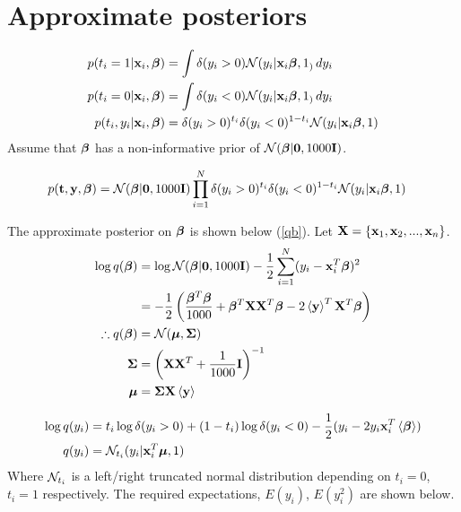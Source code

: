 \documentclass{article}
\begin{document}
\section{Approximate posteriors}
\begin{align}
\nonumber p(t_i=1|\mathbf{x}_i,\bm{\beta})&=\int \delta(y_i>0){\mathcal{N}}(y_i|\mathbf{x}_i\bm{\beta},1_)\,dy_i\\
\nonumber p(t_i=0|\mathbf{x}_i,\bm{\beta})&=\int \delta(y_i<0){\mathcal{N}}(y_i|\mathbf{x}_i\bm{\beta},1_)\,dy_i\\
p(t_i,y_i|\mathbf{x}_i,\bm{\beta})&=\delta(y_i>0)^{t_i}\delta(y_i<0)^{1-t_i}{\mathcal{N}}(y_i|\mathbf{x}_i\bm{\beta},1)
\end{align}
Assume that $\bm{\beta}$ has a non-informative prior of ${\mathcal{N}}(\bm{\beta}|{\mathbf{0}},1000\mathbf{I})$.

\begin{align}
p({\mathbf{t}},\mathbf{y},\bm{\beta})&={\mathcal{N}}(\bm{\beta}|{\mathbf{0}},1000\mathbf{I})\prod_{i=1}^{N}\delta(y_i>0)^{t_i}\delta(y_i<0)^{1-t_i}{\mathcal{N}}(y_i|\mathbf{x}_i\bm{\beta},1)
\end{align}

The approximate posterior on $\bm{\beta}$ is shown below (\eqref{qb}). Let $\mathbf{X}=\{\mathbf{x}_1,\mathbf{x}_2,...,\mathbf{x}_n\}$.
\begin{align}
\nonumber\log q(\bm{\beta})&=\log {\mathcal{N}}(\bm{\beta}|{\mathbf{0}},1000\mathbf{I})-\frac{1}{2}\sum_{i=1}^{N}(y_i-\mathbf{x}_i^T\bm{\beta})^2\\
\nonumber&=-\frac{1}{2}\left(\frac{\bm{\beta}^T\bm{\beta}}{1000}+\bm{\beta}^T\mathbf{X}\mathbf{X}^T\bm{\beta}-2\left\langle\mathbf{y}\right\rangle^T\mathbf{X}^T\bm{\beta}\right)\\
\therefore q(\bm{\beta})&={\mathcal{N}}({\boldsymbol{\mu}},{\mathbf{\Sigma}})\\
\label{eq:qb}
{\mathbf{\Sigma}}&=\left(\mathbf{X}\mathbf{X}^T+\frac{1}{1000}\mathbf{I}\right)^{-1}\\
{\boldsymbol{\mu}}&={\mathbf{\Sigma}}\mathbf{X}\left\langle\mathbf{y}\right\rangle
\end{align}

\begin{align}
\nonumber\log q(y_i)&=t_i\log \delta(y_i>0)+(1-t_i)\log \delta(y_i<0)-\frac{1}{2}(y_i-2y_i\mathbf{x}_i^T\left\langle\bm{\beta}\right\rangle)\\
q(y_i)&={\mathcal{N}}_{t_i}(y_i|\mathbf{x}_i^T{\boldsymbol{\mu}},1)
\end{align}
Where ${\mathcal{N}}_{t_i}$ is a left/right truncated normal distribution depending on $t_i=0$, $t_i=1$ respectively. The required expectations, $E(y_i)$, $E(y_i^2)$ are shown below.
\end{document}
